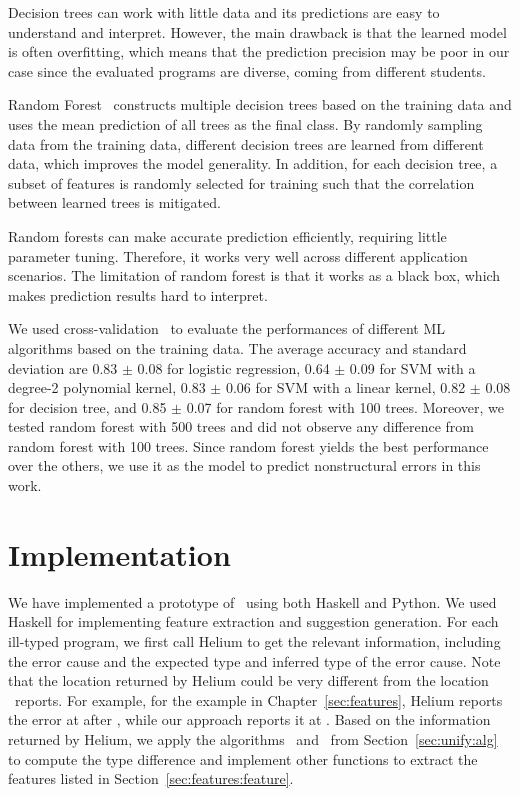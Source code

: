 \documentclass[12pt]{report}	%
\begin{document}
Decision trees can work with little data and its predictions are easy
to understand and interpret.
However, the main drawback is that the learned model is often overfitting,
which means that the prediction precision may be poor 
in our case since the evaluated programs are diverse, coming from different students.

%
Random Forest~\cite{breiman2001random} constructs multiple decision trees based on the training data
and uses the mean prediction of all trees as the final class.
By randomly sampling data from the training data,
different decision trees are learned from different data, 
which improves the model generality.
In addition, for each decision tree, a subset of features
is randomly selected for training such that the correlation between
learned trees is mitigated. 

Random forests can make accurate prediction efficiently, 
requiring little parameter tuning.
Therefore, it works very well across different application scenarios. 
The limitation of random forest is that it works as a black box, which 
makes prediction results hard to interpret.

We used cross-validation~\cite{kohavi1995study} to evaluate the
performances of different ML algorithms based on the training data.
The average accuracy and standard deviation are
0.83 $\pm$ 0.08 for logistic regression,
0.64 $\pm$ 0.09 for SVM with a degree-2 polynomial kernel, 
0.83 $\pm$ 0.06 for SVM with a linear kernel, 
0.82 $\pm$ 0.08 for decision tree,
and 0.85 $\pm$ 0.07 for random forest with 100 trees.
%
Moreover, we tested random forest with 500 trees and 
did not observe any difference from random forest
with 100 trees. 
%
Since random forest yields the best performance over the others,
we use it as the model to predict nonstructural errors in this work.

\section{Implementation}
\label{sec:ml:impl}

We have implemented a prototype of \newCompiler\ using both Haskell and
Python. We used Haskell for implementing feature extraction and
suggestion generation. For each ill-typed program, we first call
Helium to get the relevant information, including the error
cause and the expected type and inferred type of the error cause. Note
that the location returned by Helium could be
very different from the location \newCompiler\ reports. For
example, for the  example in Chapter~\ref{sec:features},
Helium reports the error at  after \prog{++}, while our
approach reports it at . Based on the information
returned by Helium, we apply the algorithms \ualg\ and \dalg\ from
Section~\ref{sec:unify:alg} to compute the type difference and
implement other functions to extract the features listed
in Section~\ref{sec:features:feature}.
\end{document}
